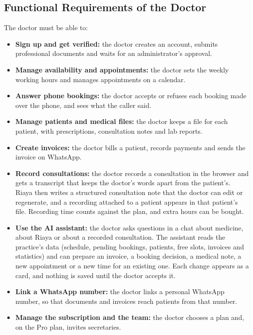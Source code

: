 \subsection{Functional Requirements of the Doctor}
The doctor must be able to:
\begin{itemize}
    \item \textbf{Sign up and get verified:} the doctor creates an account, submits professional documents and waits for an administrator's approval.
    \item \textbf{Manage availability and appointments:} the doctor sets the weekly working hours and manages appointments on a calendar.
    \item \textbf{Answer phone bookings:} the doctor accepts or refuses each booking made over the phone, and sees what the caller said.
    \item \textbf{Manage patients and medical files:} the doctor keeps a file for each patient, with prescriptions, consultation notes and lab reports.
    \item \textbf{Create invoices:} the doctor bills a patient, records payments and sends the invoice on WhatsApp.
    \item \textbf{Record consultations:} the doctor records a consultation in the browser and gets a transcript that keeps the doctor's words apart from the patient's. Riaya then writes a structured consultation note that the doctor can edit or regenerate, and a recording attached to a patient appears in that patient's file. Recording time counts against the plan, and extra hours can be bought.
    \item \textbf{Use the AI assistant:} the doctor asks questions in a chat about medicine, about Riaya or about a recorded consultation. The assistant reads the practice's data (schedule, pending bookings, patients, free slots, invoices and statistics) and can prepare an invoice, a booking decision, a medical note, a new appointment or a new time for an existing one. Each change appears as a card, and nothing is saved until the doctor accepts it.
    \item \textbf{Link a WhatsApp number:} the doctor links a personal WhatsApp number, so that documents and invoices reach patients from that number.
    \item \textbf{Manage the subscription and the team:} the doctor chooses a plan and, on the Pro plan, invites secretaries.
\end{itemize}

